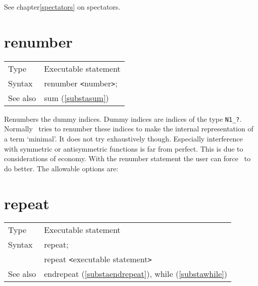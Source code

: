 \noindent See chapter\ref{spectators} on spectators.
\vspace{10mm}


\section{renumber}
\label{substarenumber}

\noindent \begin{tabular}{ll}
Type & Executable statement\\
Syntax & renumber {\tt<}number{\tt>};
\\ See also & sum (\ref{substasum})
\end{tabular}\vspace{4mm}

\noindent Renumbers the dummy 
indices. Dummy indices are indices of the type 
\verb:N1_?:. Normally \FORM\ tries to renumber these indices to make the 
internal representation of a term `minimal'. It does not try exhaustively 
though. Especially interference with symmetric or antisymmetric functions 
is far from perfect. This is due to considerations of economy. With the 
renumber statement the user can force \FORM\ to do better. The allowable 
options are:


\vspace{10mm}


\section{repeat}
\label{substarepeat}

\noindent \begin{tabular}{ll}
Type & Executable statement\\
Syntax & repeat; \\
       & repeat {\tt<}executable statement{\tt>}
\\ See also & endrepeat (\ref{substaendrepeat}), while (\ref{substawhile})
\end{tabular} \vspace{4mm}


